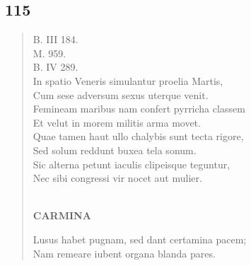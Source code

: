 \documentclass[11pt, a4paper]{report}
\begin{document}
            \subsection*{115}
      \begin{verse}
      B. III 184. \\ M. 959. \\ B. IV 289. \\ In spatio Veneris simulantur proelia Martis, \\ Cum sese adversum sexus uterque venit. \\ Femineam maribus nam confert pyrricha classem \\ Et velut in morem militis arma movet. \\ Quae tamen haut ullo chalybis sunt tecta rigore, \\ Sed solum reddunt buxea tela sonum. \\ Sic alterna petunt iaculis clipeisque teguntur, \\ Nec sibi congressi vir nocet aut mulier. \\ 
        ﻿\pagebreak 
     \marginpar{[10]} \begin{center} \textbf{CARMINA} \end{center}Lusus habet pugnam, sed dant certamina pacem; \\ Nam remeare iubent organa blanda pares. \\ 
      \end{verse}
  
\end{document}
